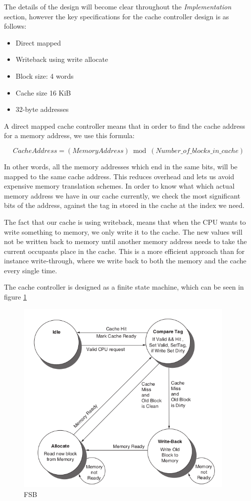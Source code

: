 \documentclass{article}
\begin{document}
The details of the design will become clear throughout the \textit{Implementation} section, however the key specifications for the cache controller design is as follows:
\begin{itemize}
  \item{Direct mapped}
  \item{Writeback using write allocate}
  \item{Block size: 4 words}
  \item{Cache size 16 KiB}
  \item{32-byte addresses}
\end{itemize}

A direct mapped cache controller means that in order to find the cache address for a memory address, we use this formula:

\begin{equation*}
  CacheAddress = (MemoryAddress) \bmod (Number\_of\_blocks\_in\_cache)
\end{equation*}

In other words, all the memory addresses which end in the same bits, will be mapped to the same cache address. This reduces overhead and lets us avoid expensive memory translation schemes. In order to know what which actual memory address we have in our cache currently, we check the most significant bits of the address, against the tag in stored in the cache at the index we need.

The fact that our cache is using writeback, means that when the CPU wants to write something to memory, we only write it to the cache. The new values will not be written back to memory until another memory address needs to take the current occupants place in the cache. This is a more efficient approach than for instance write-through, where we write back to both the memory and the cache every single time.

The cache controller is designed as a finite state machine, which can be seen in figure \ref{FSB}


\begin{figure}[H]
 \centering
  \includegraphics[width=300pt]{img/FSB.png}
  \caption{FSB\cite{BOOK}}
  \label{FSB}
 \end{figure}
\end{document}
